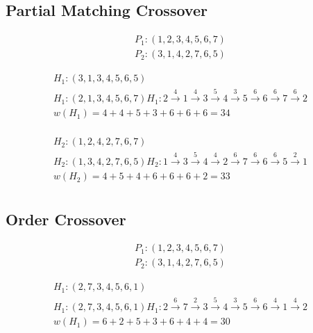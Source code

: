 \documentclass{article}
\begin{document}
\subsection{Partial Matching Crossover}
\begin{equation*}
  \begin{split}
    P_1: (1,2,\boxed{3,4,5},6,7)\\
    P_2: (3,1,\boxed{4,2,7},6,5)
  \end{split}
\end{equation*}

\begin{equation*}
  \begin{split}
    H_1: (3,1,\boxed{3,4,5},6,5)\\
    H_1: (2,1,3,4,5,6,7) H_1: 2 \overset{4}{\rightarrow} 1 \overset{4}{\rightarrow} 3 \overset{5}{\rightarrow} 4 \overset{3}{\rightarrow} 5 \overset{6}{\rightarrow} 6 \overset{6}{\rightarrow} 7 \overset{6}{\rightarrow} 2\\
    w(H_1) = 4 + 4 + 5 + 3 + 6 + 6 + 6 = 34\\
  \end{split}
\end{equation*}

\begin{equation*}
  \begin{split}
    H_2: (1,2,\boxed{4,2,7},6,7)\\
    H_2: (1,3,4,2,7,6,5) H_2: 1 \overset{4}{\rightarrow} 3 \overset{5}{\rightarrow} 4 \overset{4}{\rightarrow} 2 \overset{6}{\rightarrow} 7 \overset{6}{\rightarrow} 6 \overset{6}{\rightarrow} 5 \overset{2}{\rightarrow} 1\\
    w(H_2) = 4 + 5 + 4 + 6 + 6 + 6 + 2 = 33\\
  \end{split}
\end{equation*}

\subsection{Order Crossover}
\begin{equation*}
  \begin{split}
    P_1: (1,2,\boxed{3,4,5},6,7)\\
    P_2: (3,1,\boxed{4,2,7},6,5)
  \end{split}
\end{equation*}

\begin{equation*}
  \begin{split}
    H_1: (2,7,\boxed{3,4,5},6,1)\\
    H_1: (2,7,3,4,5,6,1) H_1: 2 \overset{6}{\rightarrow} 7 \overset{2}{\rightarrow} 3 \overset{5}{\rightarrow} 4 \overset{3}{\rightarrow} 5 \overset{6}{\rightarrow} 6 \overset{4}{\rightarrow} 1 \overset{4}{\rightarrow} 2\\
    w(H_1) = 6 + 2 + 5 + 3 + 6 + 4 + 4 = 30\\
  \end{split}
\end{equation*}
\end{document}
